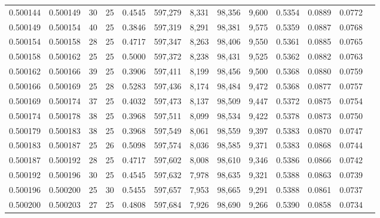 \begin{tabular}{rrrrrrrrrrrrr}
0.500144 & 0.500149 &    30 &  25 &                                     0.4545 & 597,279 &   8,331 &  98,356 &   9,600 & 0.5354 & 0.0889 & 0.0772 \\
0.500149 & 0.500154 &    40 &  25 &                                     0.3846 & 597,319 &   8,291 &  98,381 &   9,575 & 0.5359 & 0.0887 & 0.0768 \\
0.500154 & 0.500158 &    28 &  25 &                                     0.4717 & 597,347 &   8,263 &  98,406 &   9,550 & 0.5361 & 0.0885 & 0.0765 \\
0.500158 & 0.500162 &    25 &  25 &                                     0.5000 & 597,372 &   8,238 &  98,431 &   9,525 & 0.5362 & 0.0882 & 0.0763 \\
0.500162 & 0.500166 &    39 &  25 &                                     0.3906 & 597,411 &   8,199 &  98,456 &   9,500 & 0.5368 & 0.0880 & 0.0759 \\
0.500166 & 0.500169 &    25 &  28 &                                     0.5283 & 597,436 &   8,174 &  98,484 &   9,472 & 0.5368 & 0.0877 & 0.0757 \\
0.500169 & 0.500174 &    37 &  25 &                                     0.4032 & 597,473 &   8,137 &  98,509 &   9,447 & 0.5372 & 0.0875 & 0.0754 \\
0.500174 & 0.500178 &    38 &  25 &                                     0.3968 & 597,511 &   8,099 &  98,534 &   9,422 & 0.5378 & 0.0873 & 0.0750 \\
0.500179 & 0.500183 &    38 &  25 &                                     0.3968 & 597,549 &   8,061 &  98,559 &   9,397 & 0.5383 & 0.0870 & 0.0747 \\
0.500183 & 0.500187 &    25 &  26 &                                     0.5098 & 597,574 &   8,036 &  98,585 &   9,371 & 0.5383 & 0.0868 & 0.0744 \\
0.500187 & 0.500192 &    28 &  25 &                                     0.4717 & 597,602 &   8,008 &  98,610 &   9,346 & 0.5386 & 0.0866 & 0.0742 \\
0.500192 & 0.500196 &    30 &  25 &                                     0.4545 & 597,632 &   7,978 &  98,635 &   9,321 & 0.5388 & 0.0863 & 0.0739 \\
0.500196 & 0.500200 &    25 &  30 &                                     0.5455 & 597,657 &   7,953 &  98,665 &   9,291 & 0.5388 & 0.0861 & 0.0737 \\
0.500200 & 0.500203 &    27 &  25 &                                     0.4808 & 597,684 &   7,926 &  98,690 &   9,266 & 0.5390 & 0.0858 & 0.0734 \\

\end{tabular}
